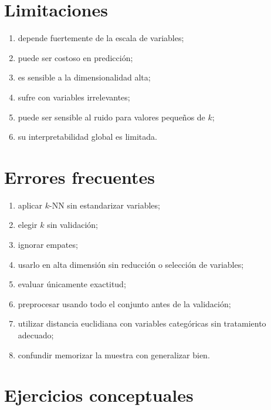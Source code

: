\documentclass[
  spanish,
  10.5pt,
  letterpaper,
  DIV=11,
  numbers=noendperiod,
  oneside,
  open=any]{scrreprt}
\providecommand{\tightlist}{%
  \setlength{\itemsep}{0pt}\setlength{\parskip}{0pt}}
\theoremstyle{definition}
\theoremstyle{definition}
\theoremstyle{plain}
\theoremstyle{remark}
\begin{document}
\section*{Limitaciones}\label{limitaciones}


\begin{enumerate}
\def\labelenumi{\arabic{enumi}.}
\tightlist
\item
  depende fuertemente de la escala de variables;
\item
  puede ser costoso en predicción;
\item
  es sensible a la dimensionalidad alta;
\item
  sufre con variables irrelevantes;
\item
  puede ser sensible al ruido para valores pequeños de \(k\);
\item
  su interpretabilidad global es limitada.
\end{enumerate}

\section*{Errores frecuentes}\label{errores-frecuentes-10}


\begin{enumerate}
\def\labelenumi{\arabic{enumi}.}
\tightlist
\item
  aplicar \(k\)-NN sin estandarizar variables;
\item
  elegir \(k\) sin validación;
\item
  ignorar empates;
\item
  usarlo en alta dimensión sin reducción o selección de variables;
\item
  evaluar únicamente exactitud;
\item
  preprocesar usando todo el conjunto antes de la validación;
\item
  utilizar distancia euclidiana con variables categóricas sin
  tratamiento adecuado;
\item
  confundir memorizar la muestra con generalizar bien.
\end{enumerate}

\section*{Ejercicios conceptuales}\label{ejercicios-conceptuales-10}
\end{document}
